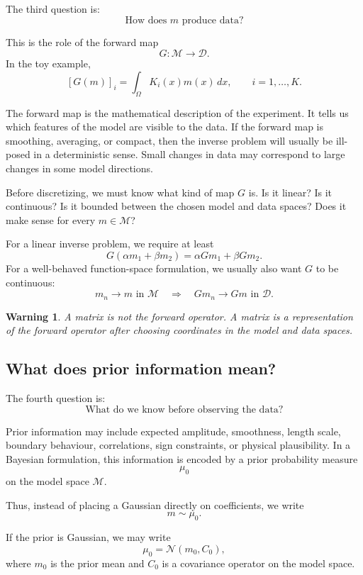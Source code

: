 \documentclass[11pt,a4paper]{book}
\newtheorem{warning}[definition]{Warning}
\newcommand{\M}{\mathcal{M}}      %
\newcommand{\D}{\mathcal{D}}      %
\newcommand{\prior}{\mu_0}
\newcommand{\G}{G}
\begin{document}
The third question is:
\[
    \text{How does } m \text{ produce data?}
\]

This is the role of the forward map
\[
    \G : \M \to \D.
\]
In the toy example,
\[
    [\G(m)]_i
    =
    \int_{\Omega} K_i(x)m(x)\,dx,
    \qquad
    i=1,\ldots,K.
\]

The forward map is the mathematical description of the experiment. It tells us
which features of the model are visible to the data. If the forward map is
smoothing, averaging, or compact, then the inverse problem will usually be
ill-posed in a deterministic sense. Small changes in data may correspond to
large changes in some model directions.

Before discretizing, we must know what kind of map $\G$ is. Is it linear? Is it
continuous? Is it bounded between the chosen model and data spaces? Does it
make sense for every $m\in\M$?

For a linear inverse problem, we require at least
\[
    \G(\alpha m_1+\beta m_2)
    =
    \alpha \G m_1 + \beta \G m_2.
\]
For a well-behaved function-space formulation, we usually also want $\G$ to be
continuous:
\[
    m_n \to m \text{ in } \M
    \quad \Longrightarrow \quad
    \G m_n \to \G m \text{ in } \D.
\]

\begin{warning}
A matrix is not the forward operator. A matrix is a representation of the
forward operator after choosing coordinates in the model and data spaces.
\end{warning}

\subsection{What does prior information mean?}

The fourth question is:
\[
    \text{What do we know before observing the data?}
\]

Prior information may include expected amplitude, smoothness, length scale,
boundary behaviour, correlations, sign constraints, or physical plausibility.
In a Bayesian formulation, this information is encoded by a prior probability
measure
\[
    \prior
\]
on the model space $\M$.

Thus, instead of placing a Gaussian directly on coefficients, we write
\[
    m \sim \prior.
\]

If the prior is Gaussian, we may write
\[
    \prior = \mathcal{N}(m_0,C_0),
\]
where $m_0$ is the prior mean and $C_0$ is a covariance operator on the model
space.
\end{document}
